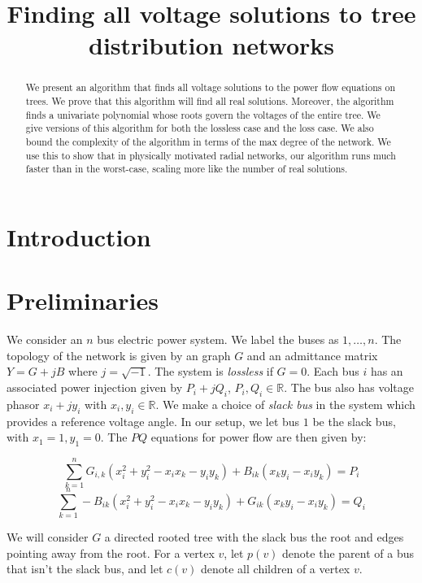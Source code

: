 \documentclass[10pt, a4paper, twoside]{article}
\title{Finding all voltage solutions to tree distribution networks}
\author{}
\date{}
\theoremstyle{plain}
\numberwithin{equation}{section}
\theoremstyle{definition}
\theoremstyle{remark}
\newcommand{\real}{\mathbb{R}}
\begin{document}
\maketitle

\begin{abstract}
We present an algorithm that finds all voltage solutions to the power flow equations on trees. We prove that this algorithm will find all real solutions. Moreover, the algorithm finds a univariate polynomial whose roots govern the voltages of the entire tree. We give versions of this algorithm for both the lossless case and the loss case. We also bound the complexity of the algorithm in terms of the max degree of the network. We use this to show that in physically motivated radial networks, our algorithm runs much faster than in the worst-case, scaling more like the number of real solutions.\end{abstract}

\section{Introduction}

\section{Preliminaries}

We consider an $n$ bus electric power system. We label the buses as $1,\ldots, n$. The topology of the network is given by an graph $G$ and an admittance matrix $Y = G+jB$ where $j = \sqrt{-1}$. The system is {\it lossless} if $G = 0$. Each bus $i$ has an associated power injection given by $P_i + jQ_i$, $P_i, Q_i \in \real$. The bus also has voltage phasor $x_i +jy_i$ with $x_i, y_i \in \real$. We make a choice of {\it slack bus} in the system which provides a reference voltage angle. In our setup, we let bus $1$ be the slack bus, with $x_1 = 1, y_1 = 0$. The $PQ$ equations for power flow are then given by:

\begin{equation}
\sum_{k=1}^n G_{i,k}(x_i^2+y_i^2-x_ix_k-y_iy_k) + B_{ik}(x_ky_i-x_iy_k) = P_i
\end{equation}
\begin{equation}
\sum_{k=1}^n -B_{ik}(x_i^2+y_i^2-x_ix_k-y_iy_k) +G_{ik}(x_ky_i-x_iy_k) = Q_i
\end{equation}

We will consider $G$ a directed rooted tree with the slack bus the root and edges pointing away from the root. For a vertex $v$, let $p(v)$ denote the parent of a bus that isn't the slack bus, and let $c(v)$ denote all children of a vertex $v$.
\end{document}
